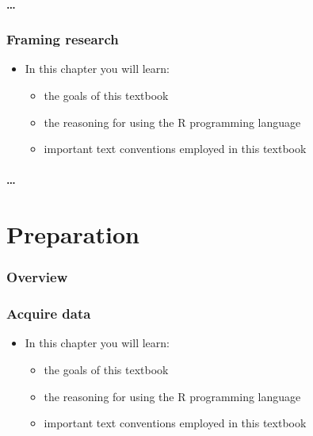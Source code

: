 \documentclass[
]{article}
\providecommand{\tightlist}{%
  \setlength{\itemsep}{0pt}\setlength{\parskip}{0pt}}
\newenvironment{rmdblock}[1]
  {\begin{shaded*}
  \begin{itemize}
  \renewcommand{\labelitemi}{
    \raisebox{-.5\height}[0pt][0pt]{
      {\setkeys{Gin}{width=2em,keepaspectratio}\texttt{[image: assets/images/\#1]}}
    }
  }
  \item
  }
  {
  \end{itemize}
  \end{shaded*}
  }
\newenvironment{rmdkey}
  {\begin{rmdblock}{key}}
  {\end{rmdblock}}
\begin{document}
\hypertarget{section-2}{%
\subsection{\ldots{}}\label{section-2}}

\hypertarget{framing-research}{%
\section{Framing research}\label{framing-research}}

\begin{rmdkey}
In this chapter you will learn:

\begin{itemize}
\tightlist
\item
  the goals of this textbook
\item
  the reasoning for using the R programming language
\item
  important text conventions employed in this textbook
\end{itemize}
\end{rmdkey}

\hypertarget{section-3}{%
\subsection{\ldots{}}\label{section-3}}

\hypertarget{part-preparation}{%
\part{Preparation}\label{part-preparation}}

\hypertarget{preparation-overview}{%
\section*{Overview}\label{preparation-overview}}

\hypertarget{acquire-data}{%
\section{Acquire data}\label{acquire-data}}

\begin{rmdkey}
In this chapter you will learn:

\begin{itemize}
\tightlist
\item
  the goals of this textbook
\item
  the reasoning for using the R programming language
\item
  important text conventions employed in this textbook
\end{itemize}
\end{rmdkey}
\end{document}
